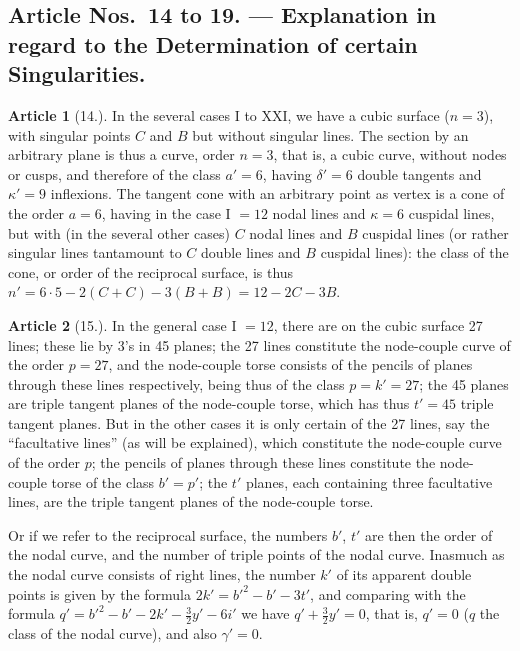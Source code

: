 \documentclass[11pt,a4paper]{article}
\theoremstyle{definition}
\newtheorem{art}{Article}
\begin{document}
\newpage
\setcounter{page}{364}

\subsection*{Article Nos.~14 to 19. --- Explanation in regard to the Determination of certain Singularities.}

\begin{art}[14.]
In the several cases I to XXI, we have a cubic surface ($n = 3$), with singular points $C$ and $B$ but without singular lines. The section by an arbitrary plane is thus a curve, order $n = 3$, that is, a cubic curve, without nodes or cusps, and therefore of the class $a' = 6$, having $\delta' = 6$ double tangents and $\kappa' = 9$ inflexions. The tangent cone with an arbitrary point as vertex is a cone of the order $a = 6$, having in the case I $= 12$ nodal lines and $\kappa = 6$ cuspidal lines, but with (in the several other cases) $C$ nodal lines and $B$ cuspidal lines (or rather singular lines tantamount to $C$ double lines and $B$ cuspidal lines): the class of the cone, or order of the reciprocal surface, is thus $n' = 6 \cdot 5 - 2(C + C) - 3(B + B) = 12 - 2C - 3B$.
\end{art}

\begin{art}[15.]
In the general case I $= 12$, there are on the cubic surface 27 lines; these lie by 3's in 45 planes; the 27 lines constitute the node-couple curve of the order $p = 27$, and the node-couple torse consists of the pencils of planes through these lines respectively, being thus of the class $p = k' = 27$; the 45 planes are triple tangent planes of the node-couple torse, which has thus $t' = 45$ triple tangent planes. But in the other cases it is only certain of the 27 lines, say the ``facultative lines'' (as will be explained), which constitute the node-couple curve of the order $p$; the pencils of planes through these lines constitute the node-couple torse of the class $b' = p'$; the $t'$ planes, each containing three facultative lines, are the triple tangent planes of the node-couple torse.

Or if we refer to the reciprocal surface, the numbers $b'$, $t'$ are then the order of the nodal curve, and the number of triple points of the nodal curve. Inasmuch as the nodal curve consists of right lines, the number $k'$ of its apparent double points is given by the formula $2k' = b'^2 - b' - 3t'$, and comparing with the formula $q' = b'^2 - b' - 2k' - \tfrac{3}{2}y' - 6i'$ we have $q' + \tfrac{3}{2}y' = 0$, that is, $q' = 0$ ($q$ the class of the nodal curve), and also $\gamma' = 0$.
\end{art}
\end{document}
